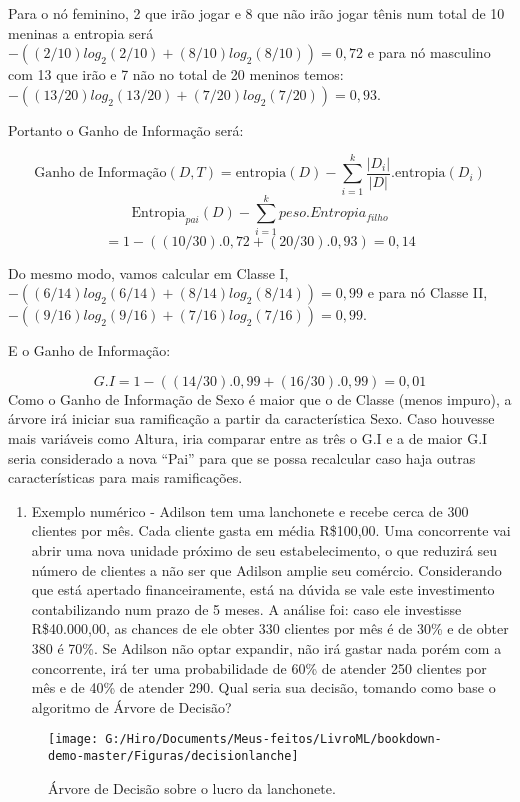 \documentclass[
  openany]{book}
\providecommand{\tightlist}{%
  \setlength{\itemsep}{0pt}\setlength{\parskip}{0pt}}
\begin{document}
Para o nó feminino, 2 que irão jogar e 8 que não irão jogar tênis num total de 10 meninas a entropia será \(- ((2/10) log_2 (2/10) + (8/10) log_2 (8/10)) = 0,72\) e para nó masculino com 13 que irão e 7 não no total de 20 meninos temos: \(- ((13/20) log_2 (13/20) + (7/20) log_2 (7/20)) = 0,93\).

Portanto o Ganho de Informação será:

\[\mbox{Ganho de Informação}(D,T)=\mbox{entropia}(D)-\displaystyle \sum_{i=1}^k \frac{|D_i|}{|D|}. \mbox{entropia}(D_i)\]
\[\mbox{Entropia}_{pai}(D)-\sum_{i=1}^k peso. Entropia_{filho}\]
\[= 1-((10/30).0,72 + (20/30). 0,93) = 0,14\]

Do mesmo modo, vamos calcular em Classe I, \(- ((6/14) log_2 (6/14) + (8/14) log_2 (8/14)) = 0,99\) e para nó Classe II, \(- ((9/16) log_2 (9/16) + (7/16) log_2 (7/16)) = 0,99\).

E o Ganho de Informação:

\[G.I = 1-((14/30) . 0,99 + (16/30) . 0,99) = 0,01\]
Como o Ganho de Informação de Sexo é maior que o de Classe (menos impuro), a árvore irá iniciar sua ramificação a partir da característica Sexo. Caso houvesse mais variáveis como Altura, iria comparar entre as três o G.I e a de maior G.I seria considerado a nova ``Pai'' para que se possa recalcular caso haja outras características para mais ramificações.

\begin{enumerate}
\def\labelenumi{\arabic{enumi}.}
\setcounter{enumi}{2}
\tightlist
\item
  Exemplo numérico - Adilson tem uma lanchonete e recebe cerca de 300 clientes por mês. Cada cliente gasta em média R\$100,00. Uma concorrente vai abrir uma nova unidade próximo de seu estabelecimento, o que reduzirá seu número de clientes a não ser que Adilson amplie seu comércio. Considerando que está apertado financeiramente, está na dúvida se vale este investimento contabilizando num prazo de 5 meses. A análise foi: caso ele investisse R\$40.000,00, as chances de ele obter 330 clientes por mês é de 30\% e de obter 380 é 70\%. Se Adilson não optar expandir, não irá gastar nada porém com a concorrente, irá ter uma probabilidade de 60\% de atender 250 clientes por mês e de 40\% de atender 290. Qual seria sua decisão, tomando como base o algoritmo de Árvore de Decisão?
\end{enumerate}

\begin{figure}

{\centering \texttt{[image: G:/Hiro/Documents/Meus-feitos/LivroML/bookdown-demo-master/Figuras/decisionlanche]} 

}

\caption{Árvore de Decisão sobre o lucro da lanchonete.}\label{fig:decisionlanche}
\end{figure}
\end{document}
